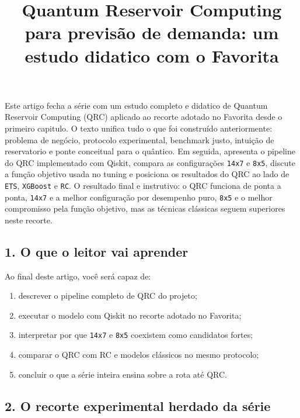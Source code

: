 \documentclass[12pt]{article}
\title{Quantum Reservoir Computing para previsão de demanda: um estudo didatico com o Favorita}
\author{}
\providecommand{\tightlist}{%
          \setlength{\itemsep}{0pt}\setlength{\parskip}{0pt}}
\begin{document}
        \maketitle

        \begin{resumo}
        Este artigo fecha a série com um estudo completo e didatico de Quantum Reservoir Computing (QRC) aplicado ao recorte adotado no Favorita desde o primeiro capitulo. O texto unifica tudo o que foi construído anteriormente: problema de negócio, protocolo experimental, benchmark justo, intuição de reservatorio e ponte conceitual para o quântico. Em seguida, apresenta o pipeline do QRC implementado com Qiskit, compara as configurações \texttt{14x7} e \texttt{8x5}, discute a função objetivo usada no tuning e posiciona os resultados do QRC ao lado de \texttt{ETS}, \texttt{XGBoost} e \texttt{RC}. O resultado final e instrutivo: o QRC funciona de ponta a ponta, \texttt{14x7} e a melhor configuração por desempenho puro, \texttt{8x5} e o melhor compromisso pela função objetivo, mas as técnicas clássicas seguem superiores neste recorte.
        \end{resumo}

        \subsection{1. O que o leitor vai aprender}\label{1-o-que-o-leitor-vai-aprender}

Ao final deste artigo, você será capaz de:

\begin{enumerate}
\def\labelenumi{\arabic{enumi}.}
\tightlist
\item
  descrever o pipeline completo de QRC do projeto;
\item
  executar o modelo com Qiskit no recorte adotado no Favorita;
\item
  interpretar por que \texttt{14x7} e \texttt{8x5} coexistem como candidatos fortes;
\item
  comparar o QRC com RC e modelos clássicos no mesmo protocolo;
\item
  concluir o que a série inteira ensina sobre a rota até QRC.
\end{enumerate}

\subsection{2. O recorte experimental herdado da série}\label{2-o-recorte-experimental-herdado-da-suxe9rie}
\end{document}
